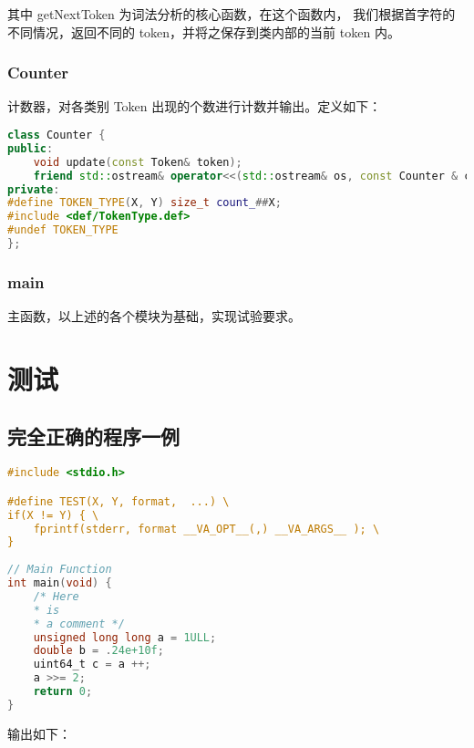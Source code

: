 \documentclass[blue,normal,cn]{elegantnote}
\begin{document}
其中 getNextToken 为词法分析的核心函数，在这个函数内，
我们根据首字符的不同情况，返回不同的 token，并将之保存到类内部的当前 token 内。

\subsubsection{Counter}

计数器，对各类别 Token 出现的个数进行计数并输出。定义如下：

\begin{lstlisting}[language=C++]
class Counter {
public:
    void update(const Token& token);
    friend std::ostream& operator<<(std::ostream& os, const Counter & counter);
private:
#define TOKEN_TYPE(X, Y) size_t count_##X;
#include <def/TokenType.def>
#undef TOKEN_TYPE
};
\end{lstlisting}

\subsubsection{main}
主函数，以上述的各个模块为基础，实现试验要求。

\section{测试}
\subsection{完全正确的程序一例}
\begin{lstlisting}[language=C]
#include <stdio.h>

#define TEST(X, Y, format,  ...) \
if(X != Y) { \
    fprintf(stderr, format __VA_OPT__(,) __VA_ARGS__ ); \
} 
    
// Main Function
int main(void) {
    /* Here
    * is
    * a comment */
    unsigned long long a = 1ULL;
    double b = .24e+10f;
    uint64_t c = a ++;
    a >>= 2;
    return 0;
}
\end{lstlisting}

输出如下：
\end{document}
